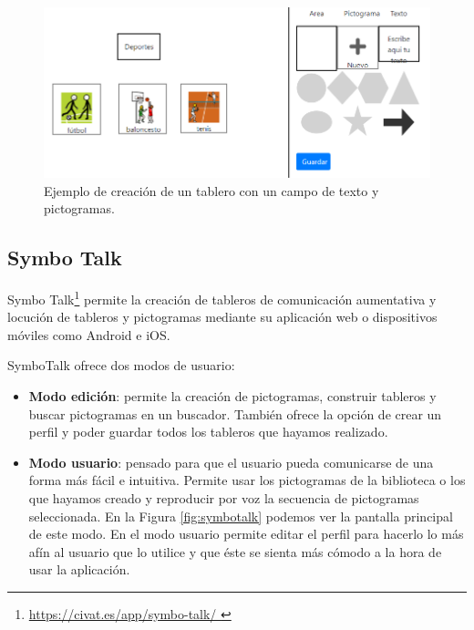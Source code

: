\begin{itemize}
	\begin{figure}[h!]
		\centering
		\includegraphics[width=0.7\linewidth]{Imagenes/Bitmap/tableroPicTableros}
		\caption{Ejemplo de creación de un tablero con un campo de texto y pictogramas.}
		\label{fig:tableropictableros}
	\end{figure}
	
	
\end{itemize}


	
\subsection{Symbo Talk}

Symbo Talk\footnote{\url{  https://civat.es/app/symbo-talk/ }} permite la creación de tableros de comunicación aumentativa y locución de tableros y pictogramas mediante su aplicación web o dispositivos móviles como Android e iOS.

SymboTalk ofrece dos modos de usuario:

\begin{itemize}
	\item \textbf{Modo edición}: permite la creación de pictogramas, construir tableros y buscar pictogramas en un buscador. También ofrece la opción de crear un perfil y poder guardar todos los tableros que hayamos realizado.
	
	
	\item \textbf{Modo usuario}: pensado para que el usuario pueda comunicarse de una forma más fácil e intuitiva. Permite usar los pictogramas de la biblioteca o los que hayamos creado y reproducir por voz la secuencia de pictogramas seleccionada. En la Figura \ref{fig:symbotalk} podemos ver la pantalla principal de este modo. En el modo usuario permite editar el perfil para hacerlo lo más afín al usuario que lo utilice y que éste se sienta más cómodo a la hora de usar la aplicación.
	
	
\end{itemize}

